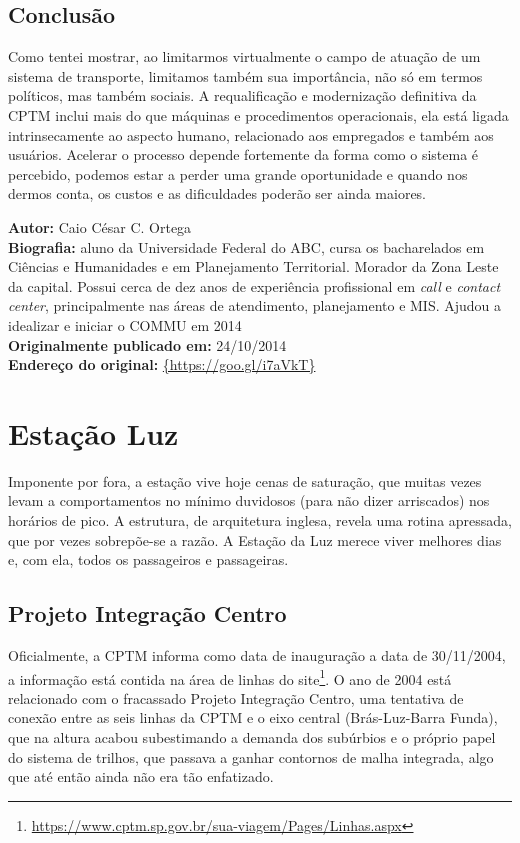 \documentclass[11pt,fleqn]{book} %
\newcommand{\infocaio}[2]{\textbf{Autor:} Caio C\'{e}sar C. Ortega \\ \textbf{Biografia:} aluno da Universidade Federal do ABC, cursa os bacharelados em Ci\^{e}ncias e Humanidades e em Planejamento Territorial. Morador da Zona Leste da capital. Possui cerca de dez anos de experi\^{e}ncia profissional em \textit{call} e \textit{contact center}, principalmente nas \'{a}reas de atendimento, planejamento e MIS. Ajudou a idealizar e iniciar o COMMU em 2014 \\ \textbf{Originalmente publicado em:} {#1} \\ \textbf{Endere\c{c}o do original:} \url{{#2}}}
\begin{document}
\subsection{Conclusão}

Como tentei mostrar, ao limitarmos virtualmente o campo de atuação de um sistema de transporte, limitamos também sua importância, não só em termos políticos, mas também sociais. A requalificação e modernização definitiva da CPTM inclui mais do que máquinas e procedimentos operacionais, ela está ligada intrinsecamente ao aspecto humano, relacionado aos empregados e também aos usuários. Acelerar o processo depende fortemente da forma como o sistema é percebido, podemos estar a perder uma grande oportunidade e quando nos dermos conta, os custos e as dificuldades poderão ser ainda maiores.

\begin{info}
	\infocaio{24/10/2014}{https://goo.gl/i7aVkT}
\end{info}

\section{Estação Luz}\label{s:luz}

Imponente por fora, a estação vive hoje cenas de saturação, que muitas vezes levam a comportamentos no mínimo duvidosos (para não dizer arriscados) nos horários de pico. A estrutura, de arquitetura inglesa, revela uma rotina apressada, que por vezes sobrepõe-se a razão. A Estação da Luz merece viver melhores dias e, com ela, todos os passageiros e passageiras.

\subsection{Projeto Integração Centro}\label{ss:icentro}

Oficialmente, a CPTM informa como data de inauguração a data de 30/11/2004, a informação está contida na área de linhas do site\footnote{\url{https://www.cptm.sp.gov.br/sua-viagem/Pages/Linhas.aspx}}. O ano de 2004 está relacionado com o fracassado Projeto Integração Centro, uma tentativa de conexão entre as seis linhas da CPTM e o eixo central (Brás-Luz-Barra Funda), que na altura acabou subestimando a demanda dos subúrbios e o próprio papel do sistema de trilhos, que passava a ganhar contornos de malha integrada, algo que até então ainda não era tão enfatizado.
\end{document}
